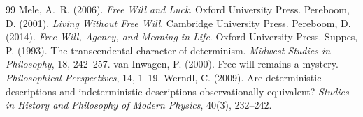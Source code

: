 \documentclass{situationist-preprint}
\begin{document}
\begin{thebibliography}{99}
 Mele, A.~R. (2006). \emph{Free Will and Luck}. Oxford University Press.
 Pereboom, D. (2001). \emph{Living Without Free Will}. Cambridge University Press.
 Pereboom, D. (2014). \emph{Free Will, Agency, and Meaning in Life}. Oxford University Press.
 Suppes, P. (1993). The transcendental character of determinism. \emph{Midwest Studies in Philosophy}, 18, 242--257.
 van Inwagen, P. (2000). Free will remains a mystery. \emph{Philosophical Perspectives}, 14, 1--19.
 Werndl, C. (2009). Are deterministic descriptions and indeterministic descriptions observationally equivalent? \emph{Studies in History and Philosophy of Modern Physics}, 40(3), 232--242.
\end{thebibliography}
\end{document}
